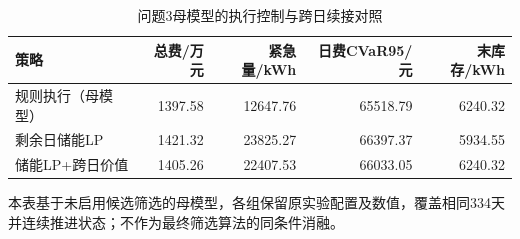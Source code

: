 \begin{table}[htbp]\centering\small
\caption{问题3母模型的执行控制与跨日续接对照}
\label{tab:v2_controllers}
\begin{tabularx}{\linewidth}{LRRRR}\toprule
策略 & 总费/万元 & 紧急量/kWh & 日费CVaR95/元 & 末库存/kWh\\\midrule
规则执行（母模型） & 1397.58 & 12647.76 & 65518.79 & 6240.32\\
剩余日储能LP & 1421.32 & 23825.27 & 66397.37 & 5934.55\\
储能LP+跨日价值 & 1405.26 & 22407.53 & 66033.05 & 6240.32\\
\bottomrule\end{tabularx}
\par\smallskip\parbox{\linewidth}{\footnotesize 本表基于未启用候选筛选的母模型，各组保留原实验配置及数值，覆盖相同334天并连续推进状态；不作为最终筛选算法的同条件消融。}
\end{table}
